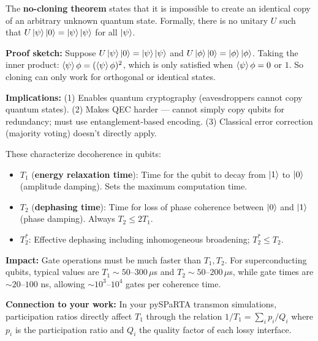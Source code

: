 \documentclass[11pt,a4paper]{article}
\begin{document}
\begin{answerbox}
The \textbf{no-cloning theorem} states that it is impossible to create an identical copy of an arbitrary unknown quantum state. Formally, there is no unitary $U$ such that $U\ket{\psi}\ket{0} = \ket{\psi}\ket{\psi}$ for all $\ket{\psi}$. 

\textbf{Proof sketch:} Suppose $U\ket{\psi}\ket{0} = \ket{\psi}\ket{\psi}$ and $U\ket{\phi}\ket{0} = \ket{\phi}\ket{\phi}$. Taking the inner product: $\braket{\psi}{\phi} = (\braket{\psi}{\phi})^2$, which is only satisfied when $\braket{\psi}{\phi} = 0$ or $1$. So cloning can only work for orthogonal or identical states.

\textbf{Implications:} (1) Enables quantum cryptography (eavesdroppers cannot copy quantum states). (2) Makes QEC harder --- cannot simply copy qubits for redundancy; must use entanglement-based encoding. (3) Classical error correction (majority voting) doesn't directly apply.
\end{answerbox}

\begin{answerbox}
These characterize decoherence in qubits:
\begin{itemize}
    \item $T_1$ (\textbf{energy relaxation time}): Time for the qubit to decay from $\ket{1}$ to $\ket{0}$ (amplitude damping). Sets the maximum computation time.
    \item $T_2$ (\textbf{dephasing time}): Time for loss of phase coherence between $\ket{0}$ and $\ket{1}$ (phase damping). Always $T_2 \leq 2T_1$.
    \item $T_2^*$: Effective dephasing including inhomogeneous broadening; $T_2^* \leq T_2$.
\end{itemize}
\textbf{Impact:} Gate operations must be much faster than $T_1, T_2$. For superconducting qubits, typical values are $T_1 \sim 50$--$300\,\mu$s and $T_2 \sim 50$--$200\,\mu$s, while gate times are $\sim 20$--$100$ ns, allowing $\sim 10^3$--$10^4$ gates per coherence time.

\textbf{Connection to your work:} In your pySPaRTA transmon simulations, participation ratios directly affect $T_1$ through the relation $1/T_1 = \sum_i p_i / Q_i$ where $p_i$ is the participation ratio and $Q_i$ the quality factor of each lossy interface.
\end{answerbox}
\end{document}
